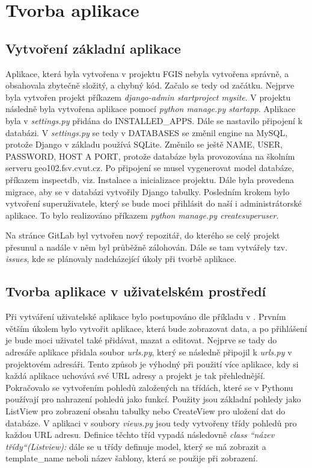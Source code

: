 \chapter{Tvorba aplikace}
\label{4-tvorba-aplikace}

\section{Vytvoření základní aplikace}

Aplikace, která byla vytvořena v projektu FGIS nebyla vytvořena
správně, a obsahovala zbytečně složitý, a chybný kód. Začalo se tedy
od začátku. Nejprve byla vytvořen projekt příkazem \emph{django-admin
  startproject mysite}. V projektu následně byla vytvořena aplikace
pomocí \emph{python manage.py startapp}. Aplikace byla v
\emph{settings.py} přidána do INSTALLED\_APPS. Dále se
nastavilo připojení k databázi. V \emph{settings.py} se tedy v
DATABASES se změnil engine na MySQL, protože Django v základu
používá SQLite. Změnilo se ještě NAME, USER, PASSWORD, HOST A PORT,
protože databáze byla provozována na školním serveru
geo102.fsv.cvut.cz. Po připojení se musel vygenerovat model databáze,
příkazem inspectdb, viz. Instalace a inicializace projektu. Dále byla
provedena migrace, aby se v databázi vytvořily Django
tabulky. Posledním krokem bylo vytvoření superuživatele, který se bude
moci přihlásit do naší i administrátorské aplikace. To bylo
realizováno příkazem \emph{python manage.py createsuperuser}.

Na stránce GitLab byl vytvořen nový repozitář, do kterého se celý
projekt přesunul a nadále v něm byl průběžně zálohován. Dále se tam
vytvářely tzv. \emph{issues}, kde se plánovaly nadcházející úkoly při
tvorbě aplikace.

\section{Tvorba aplikace v uživatelském prostředí}
Při vytváření uživatelské aplikace bylo postupováno dle příkladu v \cite{django-for-beginners}.
Prvním větším úkolem bylo vytvořit aplikace, která bude zobrazovat
data, a po přihlášení je bude moci uživatel také přidávat, mazat a
editovat. Nejprve se tady do adresáře aplikace přidala soubor  \emph{urls.py},
který se následně připojil k \emph{urls.py} v projektovém adresáři. Tento
způsob je výhodný při použití více aplikace, kdy si každá aplikace
uchovává své URL adresy a projekt je tak přehlednější. Pokračovalo se
vytvořením pohledů založených na třídách, které se v Pythonu používají
pro nahrazení pohledů jako funkcí. Použity jsou základní pohledy jako
ListView pro zobrazení obsahu tabulky nebo CreateView pro uložení dat
do databáze. V aplikaci v soubory \emph{views.py} jsou tedy vytvořeny
třídy pohledů pro každou URL adresu. Definice těchto tříd vypadá
následovně \emph{class “název třídy“(Listview):} dále se u třídy
definuje model, který se má zobrazit a template\_name neboli název
šablony, která se použije při zobrazení.

